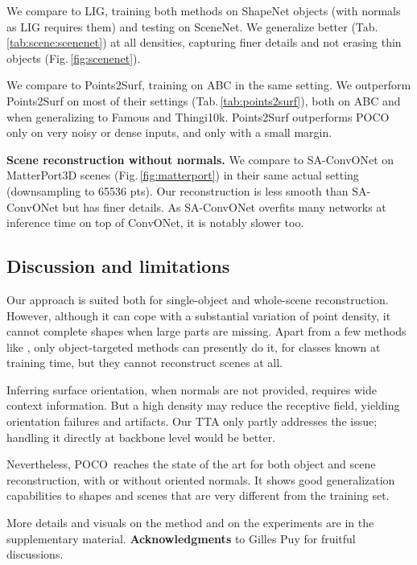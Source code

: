 \documentclass[10pt,twocolumn,letterpaper]{article}
\newcommand\OURS{{POCO}}
\begin{document}
We compare to LIG, training both methods on ShapeNet objects (with normals as LIG requires them) and testing on SceneNet. We generalize better (Tab.\,\ref{tab:scene:scenenet}) at all densities, capturing finer details and not erasing thin objects (Fig.\,\ref{fig:scenenet}).

We compare to Points2Surf, training on ABC in the same setting. We outperform Points2Surf on most of their settings (Tab.\,\ref{tab:points2surf}), both on ABC and when generalizing to Famous and Thingi10k. Points2Surf outperforms {\OURS} only on very noisy or dense inputs, and only with a small margin.


\textbf{Scene reconstruction without normals.}
We compare to SA-ConvONet on MatterPort3D scenes (Fig.\,\ref{fig:matterport}) in their same actual setting (downsampling to 65536 pts). Our reconstruction is less smooth than SA-ConvONet but has finer details. As SA-ConvONet overfits many networks at inference time on top of ConvONet, it is notably slower too.


\subsection{Discussion and limitations}

Our approach is suited both for single-object and whole-scene reconstruction. However, although it can cope with a substantial variation of point density, it cannot complete shapes when large parts are missing. Apart from a few methods like \cite{dai2017complete, dai2018scancomplete, dai2020sgnn, Siddiqui2021RetrievalFuse}, only object-targeted methods can presently do it, for classes known at training time, but they cannot reconstruct scenes at all.

Inferring surface orientation, when normals are not provided, requires wide context information. But a high density may reduce the receptive field, yielding orientation failures and artifacts. Our TTA only partly addresses the issue; handling it directly at backbone level would be better.

Nevertheless, \OURS\ reaches the state of the art for both object and scene reconstruction, with or without oriented normals. It shows good generalization capabilities to shapes and scenes that are very different from the training set.

More details and visuals on the method and on the experiments are in the supplementary material. 
\smallskip
\noindent\textbf{Acknowledgments } to Gilles Puy for fruitful discussions.
\end{document}
